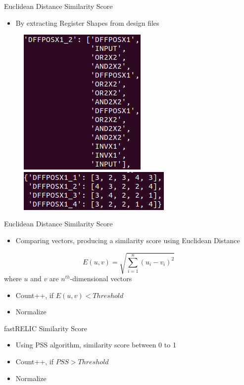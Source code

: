 \documentclass[aspectratio=169]{beamer}
\begin{document}
\begin{frame}{Euclidean Distance Similarity Score}
\begin{itemize}
	\item By extracting Register Shapes from design files
\end{itemize}
\begin{figure}
	\includegraphics[scale=0.5]{./Results/vector/shape_vector_1.png}
	\includegraphics[scale=0.5]{./Results/vector/vector.png}
\end{figure}
\end{frame}

\begin{frame}{Euclidean Distance Similarity Score}
\begin{itemize}
	\item Comparing vectors, producing a similarity score using Euclidean Distance
\end{itemize}
\begin{equation*}
\label{eqn:euclidean distance nth dimension}
E(u, v)=\sqrt{\sum_{i=1}^{n} {(u_{i} - v_{i})^2}}
\end{equation*}
where $u$ and $v$ are $n^{th}$-dimensional vectors

\begin{itemize}
	\item Count++, if $E(u, v)<Threshold$
	\item Normalize
\end{itemize}

\end{frame}

\begin{frame}{fastRELIC Similarity Score}
\begin{itemize}
	\item Using PSS algorithm, similarity score between 0 to 1
	\item Count++, if $PSS>Threshold$
	\item Normalize
\end{itemize}
\end{frame}
\end{document}
